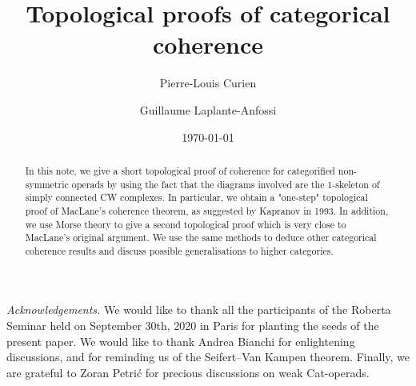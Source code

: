 \documentclass[10pt]{amsart}
\title{Topological proofs of categorical coherence}
\author{Pierre-Louis Curien}
\author{Guillaume Laplante-Anfossi}
\date{\today}
\begin{document}
\begin{abstract}
In this note, we give a short topological proof of coherence for categorified non-symmetric operads by using the fact that the diagrams involved are the 1-skeleton of simply connected CW complexes. 
In particular, we obtain a "one-step" topological proof of MacLane's coherence theorem, as suggested by Kapranov in 1993. 
In addition, we use Morse theory to give a second topological proof which is very close to MacLane's original argument. 
We use the same methods to deduce other categorical coherence results and discuss possible generalisations to higher categories. 
\end{abstract}

\maketitle

\setcounter{tocdepth}{1}




%
%
%
%
\bigskip

\emph{Acknowledgements.}   
We would like to thank all the participants of the Roberta Seminar held on September 30th, 2020 in Paris for planting the seeds of the present paper.  
We would like to thank Andrea Bianchi for enlightening discussions, and for reminding us of the Seifert--Van Kampen theorem. 
Finally, we are grateful to Zoran Petri{\'c} for precious discussions on weak Cat-operads.




\end{document}
